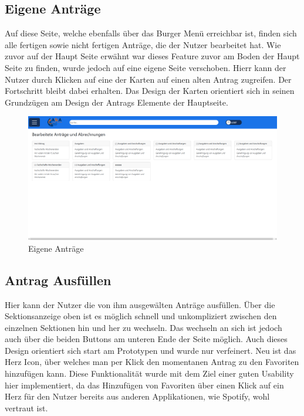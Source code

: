 \pagebreak

\subsection{Eigene Anträge}\label{Eigene Anträge}

Auf diese Seite, welche ebenfalls über das Burger Menü erreichbar ist, finden sich alle 
fertigen sowie nicht fertigen Anträge, die der Nutzer bearbeitet hat. Wie zuvor auf der 
Haupt Seite erwähnt war dieses Feature zuvor am Boden der Haupt Seite zu finden, wurde 
jedoch auf eine eigene Seite verschoben. Hierr kann der Nutzer durch Klicken auf eine der 
Karten auf einen alten Antrag zugreifen. Der Fortschritt bleibt dabei erhalten. Das Design 
der Karten orientiert sich in seinen Grundzügen am Design der Antrags Elemente der 
Hauptseite.

\begin{figure}[h]
  \centering
    \includegraphics[width=1.0\textwidth]{Doc/images/Own Antraege.png}
    \caption{Eigene Anträge}\label{Eigene Daten}
\end{figure}

\pagebreak

\subsection{Antrag Ausfüllen}\label{Antrag Ausfüllen}

Hier kann der Nutzer die von ihm ausgewälten Anträge ausfüllen. Über die Sektionsanzeige 
oben ist es möglich schnell und unkompliziert zwischen den einzelnen Sektionen hin und her 
zu wechseln. Das wechseln an sich ist jedoch auch über die beiden Buttons am unteren Ende 
der Seite möglich. Auch dieses Design orientiert sich start am Prototypen und wurde nur 
verfeinert. Neu ist das Herz Icon, über welches man per Klick den momentanen Antrag zu den 
Favoriten hinzufügen kann. Diese Funktionalität wurde mit dem Ziel einer guten Usability 
hier implementiert, da das Hinzufügen von Favoriten über einen Klick auf ein Herz für 
den Nutzer bereits aus anderen Applikationen, wie Spotify, wohl vertraut ist.

